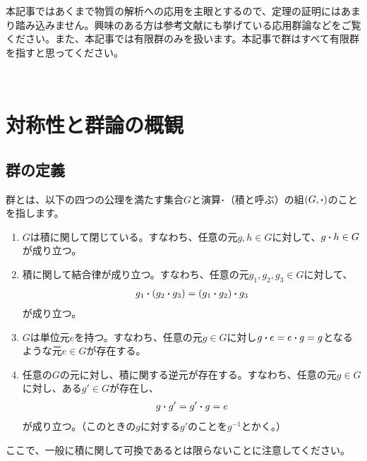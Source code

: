 \documentclass[uplatex,dvipdfmx,a4j]{jsarticle}
\begin{document}
本記事ではあくまで物質の解析への応用を主眼とするので、定理の証明にはあまり踏み込みません。興味のある方は参考文献にも挙げている応用群論\cite{ouyougunron}などをご覧ください。また、本記事では有限群のみを扱います。本記事で群はすべて有限群を指すと思ってください。


 


\section{対称性と群論の概観}
\subsection{群の定義}
群とは、以下の四つの公理を満たす集合$G$と演算$\vdot$（積と呼ぶ）の組$(G, \vdot)$のことを指します。
\begin{tcolorbox}[title = 群の公理]
	\begin{enumerate}
		\item $G$は積に関して閉じている。すなわち、任意の元$g, h \in G$に対して、$g\vdot h\in G$が成り立つ。
		\item 積に関して結合律が成り立つ。すなわち、任意の元$g_1, g_2, g_3 \in G$に対して、\begin{align}
			g_1 \vdot (g_2 \vdot g_3) = (g_1 \vdot g_2) \vdot g_3
		\end{align}
		が成り立つ。
		\item $G$は単位元$e$を持つ。すなわち、任意の元$g\in G$に対し$g\vdot e = e\vdot g = g$となるような元$e\in G$が存在する。
		\item 任意の$G$の元に対し、積に関する逆元が存在する。すなわち、任意の元$g\in G$に対し、ある$g'\in G$が存在し、\begin{align}
			g \vdot g' = g' \vdot g = e
		\end{align}が成り立つ。（このときの$g$に対する$g'$のことを$g^{-1}$とかく。）
	\end{enumerate}	
\end{tcolorbox}

ここで、一般に積に関して可換であるとは限らないことに注意してください。
\end{document}
